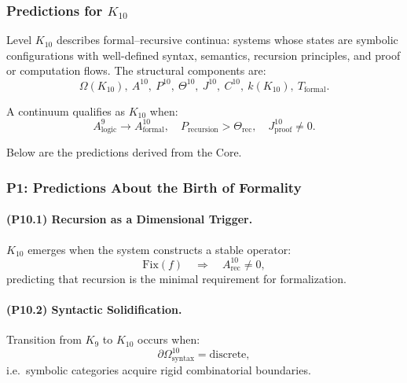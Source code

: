 

\subsubsection{Predictions for $K_{10}$}
\label{sec:predictions-k10}

Level $K_{10}$ describes formal–recursive continua:
systems whose states are symbolic configurations with
well-defined syntax, semantics, recursion principles,
and proof or computation flows.
The structural components are:
\[
\Omega(K_{10}),\
A^{10},\
P^{10},\
\Theta^{10},\
J^{10},\
C^{10},\
k(K_{10}),\
T_{\mathrm{formal}}.
\]

A continuum qualifies as $K_{10}$ when:
\[
A_{\mathrm{logic}}^{9} \to A_{\mathrm{formal}}^{10}, \quad
P_{\mathrm{recursion}} > \Theta_{\mathrm{rec}}, \quad
J_{\mathrm{proof}}^{10} \neq 0.
\]

Below are the predictions derived from the Core.

\subsubsection{P1: Predictions About the Birth of Formality}

\paragraph{(P10.1) Recursion as a Dimensional Trigger.}
$K_{10}$ emerges when the system constructs a stable operator:
\[
\mathrm{Fix}(f) \quad \Rightarrow \quad A_{\mathrm{rec}}^{10} \neq 0,
\]
predicting that recursion is the minimal requirement for formalization.

\paragraph{(P10.2) Syntactic Solidification.}
Transition from $K_9$ to $K_{10}$ occurs when:
\[
\partial\Omega_{\mathrm{syntax}}^{10} = \text{discrete},
\]
i.e.\ symbolic categories acquire rigid combinatorial boundaries.


